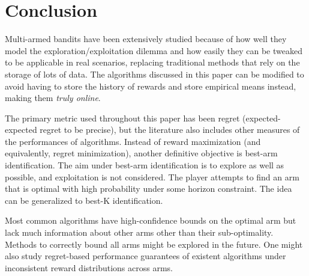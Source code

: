 \documentclass[conference]{IEEEtran}
\begin{document}
\section{Conclusion}
Multi-armed bandits have been extensively studied because of how well they model the exploration/exploitation dilemma and how easily they can be tweaked to be applicable in real scenarios, replacing traditional methods that rely on the storage of lots of data. The algorithms discussed in this paper can be modified to avoid having to store the history of rewards and store empirical means instead, making them \textit{truly online}.

The primary metric used throughout this paper has been regret (expected-expected regret to be precise), but the literature also includes other measures of the performances of algorithms. Instead of reward maximization (and equivalently, regret minimization), another definitive objective is best-arm identification. The aim under best-arm identification is to explore as well as possible, and exploitation is not considered. The player attempts to find an arm that is optimal with high probability under some horizon constraint. The idea can be generalized to best-K identification.

Most common algorithms have high-confidence bounds on the optimal arm but lack much information about other arms other than their sub-optimality. Methods to correctly bound all arms might be explored in the future. One might also study regret-based performance guarantees of existent algorithms under inconsistent reward distributions across arms.
\end{document}
